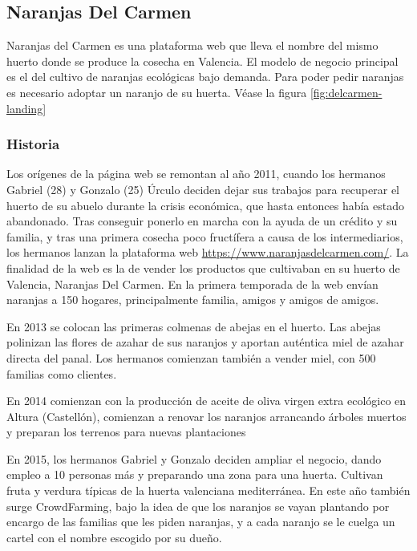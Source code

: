 \subsection{Naranjas Del Carmen}

Naranjas del Carmen es una plataforma web que lleva el nombre del mismo huerto donde se produce la cosecha en Valencia. El modelo de negocio principal es el del cultivo de naranjas ecológicas bajo demanda. Para poder pedir naranjas es necesario adoptar un naranjo de su huerta. Véase la figura \ref{fig:delcarmen-landing}


\subsubsection{Historia}

Los orígenes de la página web se remontan al año 2011, cuando los hermanos Gabriel (28) y Gonzalo (25) Úrculo deciden dejar sus trabajos para recuperar el huerto de su abuelo durante la crisis económica, que hasta entonces había estado abandonado. Tras conseguir ponerlo en marcha con la ayuda de un crédito y su familia, y tras una primera cosecha poco fructífera a causa de los intermediarios, los hermanos lanzan la plataforma web \url{https://www.naranjasdelcarmen.com/}. La finalidad de la web es la de vender los productos que cultivaban en su huerto de Valencia, Naranjas Del Carmen. En la primera temporada de la web envían naranjas a 150 hogares, principalmente familia, amigos y amigos de amigos.

En 2013 se colocan las primeras colmenas de abejas en el huerto. Las abejas polinizan las flores de azahar de sus naranjos y aportan auténtica miel de azahar directa del panal. Los hermanos comienzan también a vender miel, con 500 familias como clientes.

En 2014 comienzan con la producción de aceite de oliva virgen extra ecológico en Altura (Castellón), comienzan a renovar los naranjos arrancando árboles muertos y preparan los terrenos para nuevas plantaciones

En 2015, los hermanos Gabriel y Gonzalo deciden ampliar el negocio, dando empleo a 10 personas más y preparando una zona para una huerta. Cultivan fruta y verdura típicas de la huerta valenciana mediterránea. En este año también surge CrowdFarming, bajo la idea de que los naranjos se vayan plantando por encargo de las familias que les piden naranjas, y a cada naranjo se le cuelga un cartel con el nombre escogido por su dueño.

